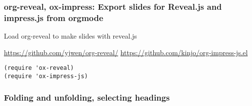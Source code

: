 \documentclass[nofonts]{tufte-handout}
\begin{document}
\subsubsection{org-reveal, ox-impress: Export slides for Reveal.js and impress.js from orgmode}
\label{sec-2-5-13}

Load org-reveal to make slides with reveal.js

\url{https://github.com/yjwen/org-reveal/}
\url{https://github.com/kinjo/org-impress-js.el}

\begin{verbatim}
(require 'ox-reveal)
(require 'ox-impress-js)
\end{verbatim}

\subsubsection{Folding and unfolding, selecting headings}
\label{sec-2-5-14}
\end{document}

